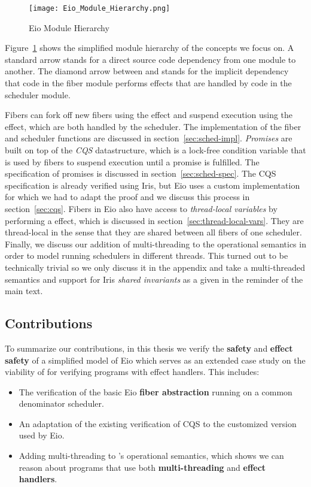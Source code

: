 \begin{figure}[ht]
  \centering
  \texttt{[image: Eio\_Module\_Hierarchy.png]}
  \caption{Eio Module Hierarchy}
  \label{fig:eio-module-hierarchy}
\end{figure}

Figure~\ref{fig:eio-module-hierarchy} shows the simplified module hierarchy of the concepts we focus on.
A standard arrow stands for a direct source code dependency from one module to another.
The diamond arrow between  and  stands for the implicit dependency that code in the fiber module performs effects that are handled by code in the scheduler module.

Fibers can fork off new fibers using the \efork{} effect and suspend execution using the \esuspend{} effect, which are both handled by the scheduler.
The implementation of the fiber and scheduler functions are discussed in section~\ref{sec:sched-impl}.
\textit{Promises} are built on top of the \textit{CQS} datastructure, which is a lock-free condition variable that is used by fibers to suspend execution until a promise is fulfilled.
The specification of promises is discussed in section~\ref{sec:sched-spec}.
The CQS specification is already verified using Iris, but Eio uses a custom implementation for which we had to adapt the proof and we discuss this process in section~\ref{sec:cqs}.
Fibers in Eio also have access to \textit{thread-local variables} by performing a \egetctx{} effect, which is discussed in section~\ref{sec:thread-local-vars}.
They are thread-local in the sense that they are shared between all fibers of one scheduler.
Finally, we discuss our addition of multi-threading to the \hazel{} operational semantics in order to model running schedulers in different threads.
This turned out to be technically trivial so we only discuss it in the appendix and take a multi-threaded semantics and support for Iris \textit{shared invariants} as a given in the reminder of the main text.

\subsection{Contributions}
\label{sec:intro-contributions}

To summarize our contributions, in this thesis we verify the \textbf{safety} and \textbf{effect safety} of a simplified model of Eio which serves as an extended case study on the viability of \hazel{} for verifying programs with effect handlers.
This includes:

\begin{itemize}
  \item The verification of the basic Eio \textbf{fiber abstraction} running on a common denominator scheduler.
  \item An adaptation of the existing verification of CQS to the customized version used by Eio.
  \item Adding multi-threading to \hazel{}'s operational semantics, which shows we can reason about programs that use both \textbf{multi-threading} and \textbf{effect handlers}.
\end{itemize}
